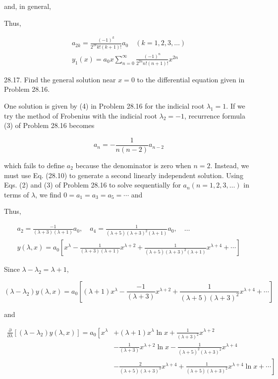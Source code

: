 \documentclass[10pt]{article}
\begin{document}
and, in general,

Thus,


\begin{gather*}
a_{2 k}=\frac{(-1)^{k}}{2^{2 k} k !(k+1) !} a_{0} \quad(k=1,2,3, \ldots) \\
y_{1}(x)=a_{0} x \sum_{n=0}^{\infty} \frac{(-1)^{n}}{2^{2 n} n !(n+1) !} x^{2 n} \tag{4}
\end{gather*}


28.17. Find the general solution near $x=0$ to the differential equation given in Problem 28.16.

One solution is given by (4) in Problem 28.16 for the indicial root $\lambda_{1}=1$. If we try the method of Frobenius with the indicial root $\lambda_{2}=-1$, recurrence formula (3) of Problem 28.16 becomes

$$
a_{n}=-\frac{1}{n(n-2)} a_{n-2}
$$

which fails to define $a_{2}$ because the denominator is zero when $n=2$. Instead, we must use Eq. (28.10) to generate a second linearly independent solution. Using Eqs. (2) and (3) of Problem 28.16 to solve sequentially for $a_{n}(n=1,2,3, \ldots)$ in terms of $\lambda$, we find $0=a_{1}=a_{3}=a_{5}=\cdots$ and

Thus,

$$
\begin{gathered}
a_{2}=\frac{-1}{(\lambda+3)(\lambda+1)} a_{0}, \quad a_{4}=\frac{1}{(\lambda+5)(\lambda+3)^{2}(\lambda+1)} a_{0}, \quad \ldots \\
y(\lambda, x)=a_{0}\left[x^{\lambda}-\frac{1}{(\lambda+3)(\lambda+1)} x^{\lambda+2}+\frac{1}{(\lambda+5)(\lambda+3)^{2}(\lambda+1)} x^{\lambda+4}+\cdots\right]
\end{gathered}
$$

Since $\lambda-\lambda_{2}=\lambda+1$,

$$
\left(\lambda-\lambda_{2}\right) y(\lambda, x)=a_{0}\left[(\lambda+1) x^{\lambda}-\frac{-1}{(\lambda+3)} x^{\lambda+2}+\frac{1}{(\lambda+5)(\lambda+3)^{2}} x^{\lambda+4}+\cdots\right]
$$

and

$$
\begin{aligned}
\frac{\partial}{\partial \lambda}\left[\left(\lambda-\lambda_{2}\right) y(\lambda, x)\right]=a_{0}\left[x^{\lambda}\right. & +(\lambda+1) x^{\lambda} \ln x+\frac{1}{(\lambda+3)^{2}} x^{\lambda+2} \\
& -\frac{1}{(\lambda+3)} x^{\lambda+2} \ln x-\frac{1}{(\lambda+5)^{2}(\lambda+3)^{2}} x^{\lambda+4} \\
& \left.-\frac{2}{(\lambda+5)(\lambda+3)^{3}} x^{\lambda+4}+\frac{1}{(\lambda+5)(\lambda+3)^{2}} x^{\lambda+4} \ln x+\cdots\right]
\end{aligned}
$$
\end{document}
